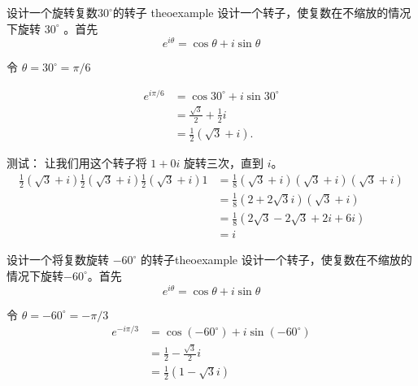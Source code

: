 \begin{myexample}{设计一个旋转复数$30^{\circ}$的转子 }{theoexample}
设计一个转子，使复数在不缩放的情况下旋转 $30^{\circ}$ 。首先
$$
    e^{i \theta}=\cos \theta+i \sin \theta
$$

令 $\theta=30^{\circ}=\pi / 6$

$$
    \begin{aligned}
        e^{i \pi / 6} & =\cos 30^{\circ}+i \sin 30^{\circ} \\
                      & =\frac{\sqrt{3}}{2}+\frac{1}{2} i  \\
                      & =\frac{1}{2}(\sqrt{3}+i) .
    \end{aligned}
$$

测试： 让我们用这个转子将 $1+0 i$ 旋转三次，直到 $i$。
$$
    \begin{aligned}
        \frac{1}{2}(\sqrt{3}+i) \frac{1}{2}(\sqrt{3}+i) \frac{1}{2}(\sqrt{3}+i) 1 & =\frac{1}{8}(\sqrt{3}+i)(\sqrt{3}+i)(\sqrt{3}+i) \\
                                                                                  & =\frac{1}{8}(2+2 \sqrt{3} i)(\sqrt{3}+i)         \\
                                                                                  & =\frac{1}{8}(2 \sqrt{3}-2 \sqrt{3}+2 i+6 i)      \\
                                                                                  & =i
    \end{aligned}
$$
\end{myexample}

\begin{myexample}{设计一个将复数旋转 $-60^{\circ}$ 的转子}{theoexample}
设计一个转子，使复数在不缩放的情况下旋转$-60^{\circ}$。首先
$$
    e^{i \theta}=\cos \theta+i \sin \theta
$$

令 $\theta=-60^{\circ}=-\pi / 3$
$$
    \begin{aligned}
        e^{-i \pi / 3} & =\cos \left(-60^{\circ}\right)+i \sin \left(-60^{\circ}\right) \\
                       & =\frac{1}{2}-\frac{\sqrt{3}}{2} i                              \\
                       & =\frac{1}{2}(1-\sqrt{3} i)
    \end{aligned}
$$
\end{myexample}









